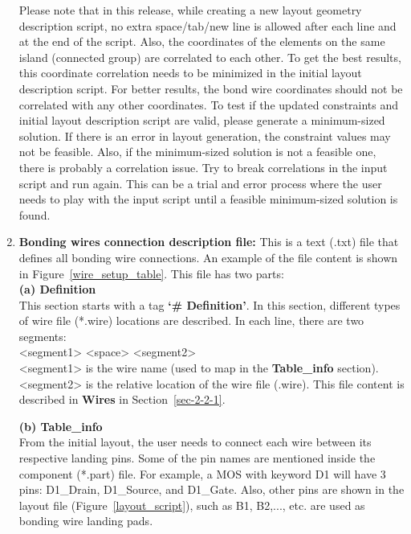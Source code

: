 \documentclass[11pt]{article}
\begin{document}
\begin{enumerate}
Please note that in this release, while creating a new layout geometry description script, no extra space/tab/new line is allowed after each line and at the end of the script. Also, the coordinates of the elements on the same island (connected group) are correlated to each other. To get the best results, this coordinate correlation needs to be minimized in the initial layout description script. For better results, the bond wire coordinates should not be correlated with any other coordinates. To test if the updated constraints and initial layout description script are valid, please generate a minimum-sized solution. If there is an error in layout generation, the constraint values may not be feasible. Also, if the minimum-sized solution is not a feasible one, there is probably a correlation issue. Try to break correlations in the input script and run again. This can be a trial and error process where the user needs to play with the input script until a feasible minimum-sized solution is found.
    
    
    \item\textbf{Bonding wires connection description file:}
    This is a text (.txt) file that defines all bonding wire connections. An example of the file content is shown in Figure~\ref{wire_setup_table}.
    This file has two parts:\\
    \textbf{(a) Definition}\\
    This section starts with a tag \textbf{`\# Definition'}. In this section, different types of wire file (*.wire) locations are described. In each line, there are two segments: \\
    <segment1> <space> <segment2>\\
    <segment1> is the wire name (used to map in the \textbf{Table\_info} section).\\
    <segment2> is the relative location of the wire file (.wire). This file content is described in \textbf{Wires} in Section~\ref{sec-2-2-1}.
    
    \textbf{(b) Table\_info}\\
    From the initial layout, the user needs to connect each wire between its respective landing pins. Some of the pin names are mentioned inside the component (*.part) file. For example, a MOS with keyword D1 will have 3 pins: D1\_Drain, D1\_Source, and D1\_Gate. Also, other pins are shown in the layout file (Figure~\ref{layout_script}), such as B1, B2,..., etc. are used as bonding wire landing pads. 
    

\end{enumerate}
\end{document}
